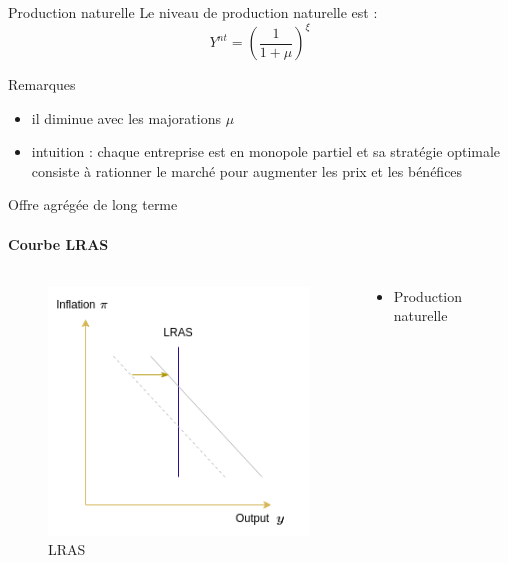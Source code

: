 \documentclass[
  ignorenonframetext,
  aspectratio=169,
]{beamer}
\providecommand{\tightlist}{%
  \setlength{\itemsep}{0pt}\setlength{\parskip}{0pt}}\usepackage{longtable,booktabs,array}
\begin{document}
\begin{frame}{Production naturelle}
\label{production-naturelle}
Le niveau de production naturelle est :
\[\boxed{Y^{nt}=\left(\frac{1}{1+\mu}\right)^{\xi}}\]

Remarques

\begin{itemize}
\tightlist
\item
  il diminue avec les majorations \(\mu\)
\item
  intuition : chaque entreprise est en monopole partiel et sa stratégie
  optimale consiste à rationner le marché pour augmenter les prix et les
  bénéfices
\end{itemize}
\end{frame}

\begin{frame}{Offre agrégée de long terme}
\label{offre-agruxe9guxe9e-de-long-terme}
\framesubtitle{Courbe LRAS}

\begin{columns}[T]
\begin{column}{0.48\textwidth}
\begin{figure}[H]

{\centering \includegraphics{assets/lras.png}

}

\caption{LRAS}

\end{figure}%
\end{column}

\begin{column}{0.48\textwidth}
\begin{itemize}
\tightlist
\item
  Production naturelle


\end{itemize}
\end{column}
\end{columns}
\end{frame}
\end{document}
